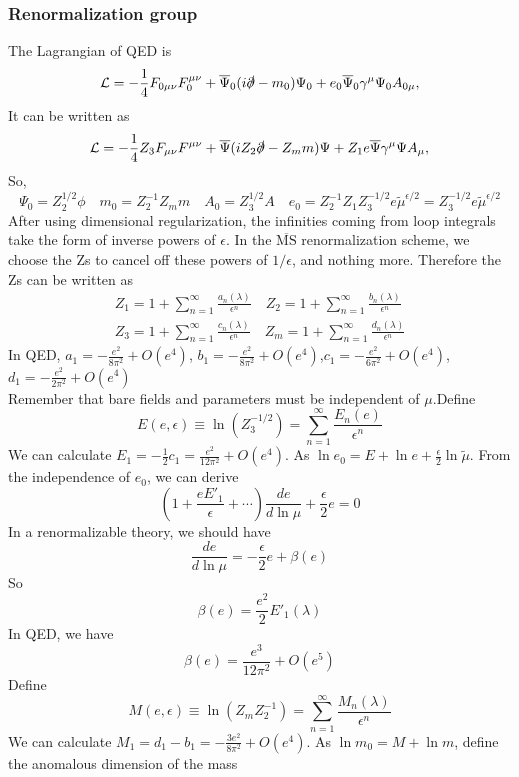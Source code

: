 \documentclass[cyan]{elegantnote}
\begin{document}
\subsubsection{Renormalization group}
\noindent
The Lagrangian of QED is
\[\mathcal{L} = -\frac{1}{4}F_{0\mu\nu}F_0^{\mu\nu} + \overline{\Psi}_0 (i\slashed{\partial}-m_0) \Psi_0 + e_0\overline{\Psi}_0\gamma^{\mu}\Psi_0 A_{0\mu}, \]
It can be written as
\[\mathcal{L} = -\frac{1}{4} Z_3 F_{\mu\nu}F^{\mu\nu} + \overline{\Psi} (iZ_2 \slashed{\partial}-Z_m m) \Psi + Z_1 e\overline{\Psi}\gamma^{\mu}\Psi A_{\mu}, \]
So,
\[\Psi_0 = Z_{2}^{1/2}\phi \quad m_0 = Z_{2}^{-1} Z_{m}m \quad A_0 = Z_3^{1/2}A \quad e_0 = Z_{2}^{-1}Z_1 Z_{3}^{-1/2} e \tilde{\mu}^{\epsilon/2} = Z_{3}^{-1/2} e \tilde{\mu}^{\epsilon/2}\]
After using dimensional regularization, the infinities coming from loop integrals take the form of inverse powers of $\epsilon$. In the  $\mathrm{\overline{MS}}$ renormalization scheme, we choose the Zs to cancel off these powers of $1/\epsilon$, and nothing more. Therefore the Zs can be written as
\begin{eqnarray}
Z_{1} = 1 + \sum_{n=1}^{\infty} \frac{a_n(\lambda)}{\epsilon^n} \quad Z_{2} = 1 + \sum_{n=1}^{\infty} \frac{b_n(\lambda)}{\epsilon^n} \nonumber \\
Z_{3} = 1 + \sum_{n=1}^{\infty} \frac{c_n(\lambda)}{\epsilon^n} \quad Z_{m} = 1 + \sum_{n=1}^{\infty} \frac{d_n(\lambda)}{\epsilon^n} \nonumber 
\end{eqnarray}
In QED, $a_1 = -\frac{e^2}{8\pi^2} + O(e^4)$, $b_1 = -\frac{e^2}{8\pi^2} + O(e^4)$,$c_1 = -\frac{e^2}{6\pi^2} + O(e^4)$,$d_1 = -\frac{e^2}{2\pi^2} + O(e^4)$\\
Remember that bare fields and parameters must be independent of $\mu$.Define
\[E(e,\epsilon) \equiv \ln(Z_3^{-1/2}) = \sum_{n=1}^{\infty} \frac{E_n(e)}{\epsilon^n}\]
We can calculate $E_1 = -\frac{1}{2}c_1 = \frac{e^2}{12\pi^2} + O(e^4)$.
As $\ln e_0 = E + \ln e + \frac{\epsilon}{2} \ln \tilde{\mu} $. From the independence of $e_0$, we can derive
\[\left ( 1 + \frac{e E'_1}{\epsilon} + \cdots \right) \frac{d e}{d\ln \mu} + \frac{\epsilon}{2} e = 0\]
In a renormalizable theory, we should have
\[\frac{d e}{d\ln\mu} = -\frac{\epsilon}{2} e + \beta(e)\]
So
\[\beta(e) = \frac{e^2}{2} E'_1(\lambda)\]
In QED, we have
\[\beta(e) = \frac{e^3}{12\pi^2} + O(e^5)\]
Define
\[M(e,\epsilon) \equiv \ln(Z_{m} Z_{2}^{-1}) = \sum_{n=1}^{\infty} \frac{M_n(\lambda)}{\epsilon^n}\]
We can calculate $M_1 = d_1 - b_1 = -\frac{3e^2}{8\pi^2} + O(e^4)$.
As $\ln m_0 = M + \ln m $, define the anomalous dimension of the mass
\end{document}
